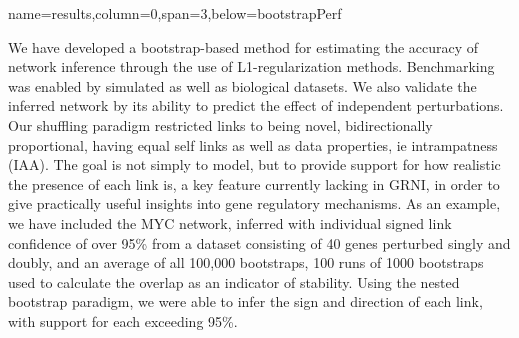 \documentclass[a0paper,portrait]{baposter}
\begin{document}
\begin{poster}
{name=results,column=0,span=3,below=bootstrapPerf}{ %
\begin{minipage}[t]{0.8\textwidth}  
\vspace{-3cm} 
We have developed a bootstrap-based method for estimating the accuracy of network inference through the use of L1-regularization methods. Benchmarking was enabled by simulated as well as  biological datasets. We also validate the inferred network by its ability to predict the effect of independent perturbations. Our shuffling paradigm restricted links to being novel, bidirectionally proportional, having equal self links as well as data properties, ie intrampatness (IAA). The goal is not simply to model, but to provide support for how realistic the presence of each link is, a key feature currently lacking in GRNI, in order to give practically useful insights into gene regulatory mechanisms.
As an example, we have included the MYC network, inferred with individual signed link confidence of over 95\% from a dataset consisting of 40 genes perturbed singly and doubly, and an average of all 100,000 bootstraps, 100 runs of 1000 bootstraps used to calculate the overlap as an indicator of stability. Using the nested bootstrap paradigm, we were able to infer the sign and direction of each link, with support for each exceeding 95\%.
%
%
%
  \end{minipage}%
  \hspace{.75cm} %
\begin{minipage}[t]{0.15\textwidth}
\hspace{.5cm}

\end{minipage}}
\end{poster}
\end{document}
